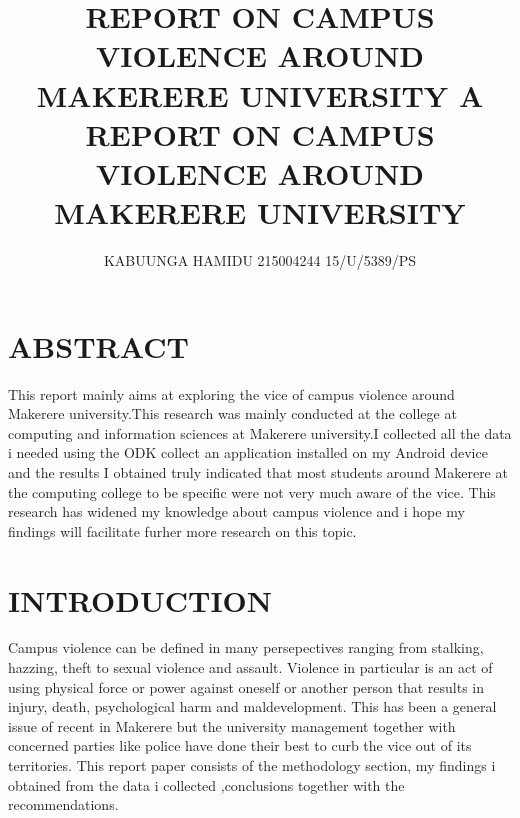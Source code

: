 \documentclass[10pt]{article}
\title{
{REPORT ON CAMPUS VIOLENCE AROUND MAKERERE UNIVERSITY}}
\author{
{KABUUNGA HAMIDU 215004244  15/U/5389/PS}}
\begin{document}
	\title{	{A REPORT ON  CAMPUS VIOLENCE AROUND MAKERERE UNIVERSITY}\\}
\maketitle
\section{ABSTRACT}
{This report mainly aims at exploring the vice of campus violence around Makerere university.This research was mainly conducted at the college at computing and information sciences at Makerere university.I collected all the data i needed using the ODK collect an application installed on my Android device and the results I obtained truly indicated that most students around Makerere at the computing college to be specific were not very much aware of the vice. This research has widened my knowledge about campus violence and i hope my findings will facilitate furher more research on this topic.}
\section{INTRODUCTION}
{Campus violence can be defined in many persepectives ranging from stalking, hazzing, theft to sexual violence and assault. Violence in particular is an act of using physical force or power against oneself or another person that results in injury, death, psychological harm and maldevelopment. This has been a general issue of recent in Makerere but the university management together with concerned parties like police have done their best to curb the vice out of its territories. This report paper consists of the methodology section, my findings i obtained from the data i collected ,conclusions together with the recommendations.}
\end{document}
